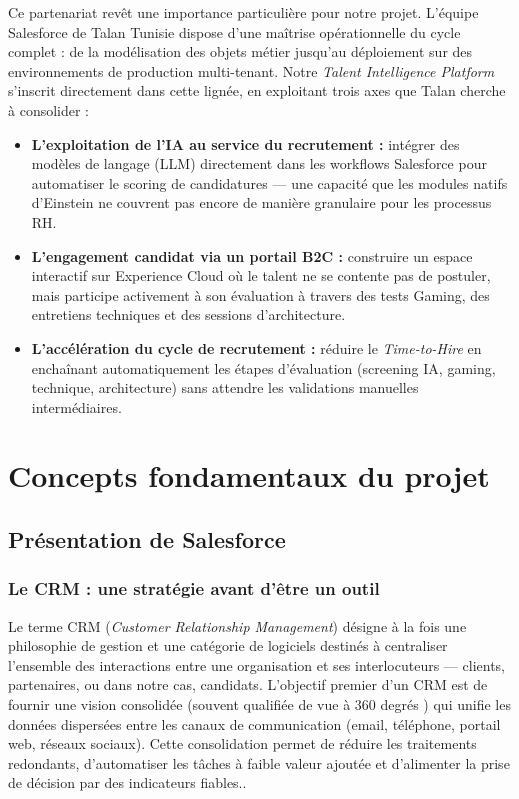 \medskip

Ce partenariat revêt une importance particulière pour notre projet. L'équipe Salesforce de Talan Tunisie dispose d'une maîtrise opérationnelle du cycle complet : de la modélisation des objets métier jusqu'au déploiement sur des environnements de production multi-tenant. Notre \textit{Talent Intelligence Platform} s'inscrit directement dans cette lignée, en exploitant trois axes que Talan cherche à consolider :

\begin{itemize}
    \item \textbf{L'exploitation de l'IA au service du recrutement :} intégrer des modèles de langage (LLM) directement dans les workflows Salesforce pour automatiser le scoring de candidatures --- une capacité que les modules natifs d'Einstein ne couvrent pas encore de manière granulaire pour les processus RH.
    \item \textbf{L'engagement candidat via un portail B2C :} construire un espace interactif sur Experience Cloud où le talent ne se contente pas de postuler, mais participe activement à son évaluation à travers des tests Gaming, des entretiens techniques et des sessions d'architecture.
    \item \textbf{L'accélération du cycle de recrutement :} réduire le \textit{Time-to-Hire} en enchaînant automatiquement les étapes d'évaluation (screening IA, gaming, technique, architecture) sans attendre les validations manuelles intermédiaires.
\end{itemize}

\FloatBarrier

\section{Concepts fondamentaux du projet}

\subsection{Présentation de Salesforce}

\subsubsection{Le CRM : une stratégie avant d'être un outil}

Le terme CRM (\textit{Customer Relationship Management}) désigne à la fois une philosophie de gestion et une catégorie de logiciels destinés à centraliser l'ensemble des interactions entre une organisation et ses interlocuteurs --- clients, partenaires, ou dans notre cas, candidats. L'objectif premier d'un CRM est de fournir une vision consolidée (souvent qualifiée de \og vue à 360 degrés \fg{}) qui unifie les données dispersées entre les canaux de communication (email, téléphone, portail web, réseaux sociaux). Cette consolidation permet de réduire les traitements redondants, d'automatiser les tâches à faible valeur ajoutée et d'alimenter la prise de décision par des indicateurs fiables.\parencite{URL9}.

